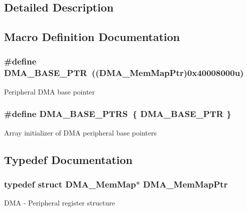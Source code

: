 \subsection{Detailed Description}


\subsection{Macro Definition Documentation}
\hypertarget{group___d_m_a___peripheral_ga6997fbc1b1973e9f27170217a3bd6f22}{}
\subsubsection[{D\+M\+A\+\_\+\+B\+A\+S\+E\+\_\+\+P\+T\+R}]{\setlength{\rightskip}{0pt plus 5cm}\#define D\+M\+A\+\_\+\+B\+A\+S\+E\+\_\+\+P\+T\+R~(({\bf D\+M\+A\+\_\+\+Mem\+Map\+Ptr})0x40008000u)}\label{group___d_m_a___peripheral_ga6997fbc1b1973e9f27170217a3bd6f22}
Peripheral D\+M\+A base pointer \hypertarget{group___d_m_a___peripheral_gada914e90165e25ae4eeddf5175920e77}{}
\subsubsection[{D\+M\+A\+\_\+\+B\+A\+S\+E\+\_\+\+P\+T\+R\+S}]{\setlength{\rightskip}{0pt plus 5cm}\#define D\+M\+A\+\_\+\+B\+A\+S\+E\+\_\+\+P\+T\+R\+S~\{ {\bf D\+M\+A\+\_\+\+B\+A\+S\+E\+\_\+\+P\+T\+R} \}}\label{group___d_m_a___peripheral_gada914e90165e25ae4eeddf5175920e77}
Array initializer of D\+M\+A peripheral base pointers 

\subsection{Typedef Documentation}
\hypertarget{group___d_m_a___peripheral_ga160c27c95a39a9791079b32fe7e843a1}{}
\subsubsection[{D\+M\+A\+\_\+\+Mem\+Map\+Ptr}]{\setlength{\rightskip}{0pt plus 5cm}typedef struct {\bf D\+M\+A\+\_\+\+Mem\+Map}$\ast$ {\bf D\+M\+A\+\_\+\+Mem\+Map\+Ptr}}\label{group___d_m_a___peripheral_ga160c27c95a39a9791079b32fe7e843a1}
D\+M\+A -\/ Peripheral register structure 